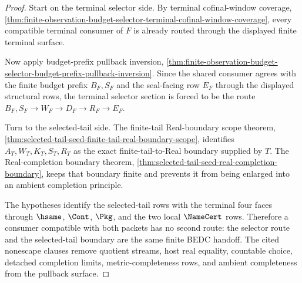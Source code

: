 \begin{proof}
Start on the terminal selector side. By terminal cofinal-window coverage, \autoref{thm:finite-observation-budget-selector-terminal-cofinal-window-coverage}, every compatible terminal consumer of $F$ is already routed through the displayed finite terminal surface.

Now apply budget-prefix pullback inversion, \autoref{thm:finite-observation-budget-selector-budget-prefix-pullback-inversion}. Since the shared consumer agrees with the finite budget prefix $B_F,S_F$ and the seal-facing row $E_F$ through the displayed structural rows, the terminal selector section is forced to be the route $B_F,S_F \to W_F \to D_F \to R_F \to E_F$.

Turn to the selected-tail side. The finite-tail Real-boundary scope theorem, \autoref{thm:selected-tail-seed-finite-tail-real-boundary-scope}, identifies $A_T,W_T,K_T,S_T,R_T$ as the exact finite-tail-to-Real boundary supplied by $T$. The Real-completion boundary theorem, \autoref{thm:selected-tail-seed-real-completion-boundary}, keeps that boundary finite and prevents it from being enlarged into an ambient completion principle.

The hypotheses identify the selected-tail rows with the terminal four faces through $\hsame$, $\Cont$, $\Pkg$, and the two local $\NameCert$ rows. Therefore a consumer compatible with both packets has no second route: the selector route and the selected-tail boundary are the same finite BEDC handoff. The cited nonescape clauses remove quotient streams, host real equality, countable choice, detached completion limits, metric-completeness rows, and ambient completeness from the pullback surface.
\end{proof}

